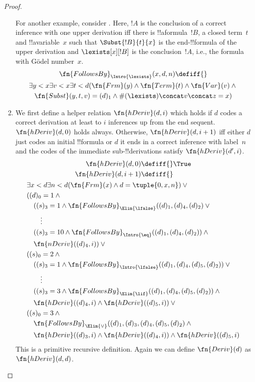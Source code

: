 \documentclass[../../include/open-logic-section]{subfiles}
\begin{document}
\begin{proof}
\begin{enumerate}
  For another example, consider \Intro{\lexists}.  Here, $!A$ is the
  conclusion of a correct inference with one upper derivation iff
  there is !!a{formula}~$!B$, a closed term~$t$ and
  !!a{variable}~$x$ such that $\Subst{!B}{t}{x}$ is the
  end-!!{formula} of the upper derivation and $\lexists[x][!B]$
  is the conclusion~$!A$, i.e., the formula with G\"odel number~$x$.
\begin{multline*}
\fn{FollowsBy}_{\Intro{\lexists}}(x, d, n) \defiff {} \\
\exists y < x\exists v<x\exists t<d(\fn{Frm}(y) \land \fn{Term}(t) \land \fn{Var}(v)  \land {}\\
\fn{Subst}(y,t,v) = (d)_1 \land \#(\lexists) \concat v \concat z = x)
\end{multline*}
\item We first define a helper relation $\fn{hDeriv}(d, i)$ which
  holds if $d$ codes a correct derivation at least to $i$ inferences
  up from the end sequent.  $\fn{hDeriv}(d, 0)$ holds always.
  Otherwise, $\fn{hDeriv}(d, i+1)$ iff either $d$ just codes an
  initial !!{formula} or $d$ it ends in a correct inference with
  label~$n$ and the codes of the immediate sub-!!{derivation}s satisfy
  $\fn{hDeriv}(d', i)$.
\begin{multline*}
  \begin{aligned}
\fn{hDeriv}(d, 0) \defiff {} & \True \\
\fn{hDeriv}(d, i+1) \defiff {} &
  \end{aligned}\\
  \begin{aligned}
& \exists x<d\exists n<d(\fn{Frm}(x) \land d = \tuple{0, x, n}) \lor {}\\
& ((d)_0 = 1 \land {}\\
& \quad ((s)_3 = 1 \land
\fn{FollowsBy}_{\Elim{\lfalse}}((d)_1, (d)_4, (d)_2) \lor{}\\
& \qquad \vdots\\
& \quad ((s)_3 = 10 \land
\fn{FollowsBy}_{\Intro{\eq}}((d)_1, (d)_4, (d)_2)) \land {}\\
& \quad \fn{nDeriv}((d)_4, i)) \lor {}\\
& ((s)_0 = 2 \land {}\\
& \quad ((s)_3 = 1 \land 
\fn{FollowsBy}_{\Intro{\lfalse}}((d)_1, (d)_4, (d)_5, (d)_2)) \lor{}\\
& \qquad \vdots\\
& \quad ((s)_3 = 3 \land
\fn{FollowsBy}_{\Elim{\lif}}((d)_1, (d)_4, (d)_5, (d)_2)) \land {}\\
& \quad \fn{hDeriv}((d)_4, i) \land \fn{hDeriv}((d)_5, i)) \lor {}\\
& ((s)_0 = 3 \land {}\\
& \quad \fn{FollowsBy}_{\Elim{\lor}}((d)_1, (d)_3, (d)_4, (d)_5, (d)_2) \land{}\\
& \quad \fn{hDeriv}((d)_3, i) \land \fn{hDeriv}((d)_4, i)) \land \fn{hDeriv}((d)_5, i)  
  \end{aligned}
  \end{multline*}
This is a primitive recursive definition. Again we can define
$\fn{Deriv}(d)$ as $\fn{hDeriv}(d, d)$.
\end{enumerate}
\end{proof}
\end{document}
